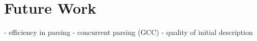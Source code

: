\section{Future Work}
\label{sec:future}

  - efficiency in parsing
  - concurrent parsing (GCC)
  - quality of initial description
